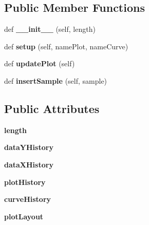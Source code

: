 \subsection*{Public Member Functions}
\begin{DoxyCompactItemize}
\item 
\mbox{\label{classmonitor_realtime_1_1_history_plot_a18d463af2d73ee5e5e0e0e0944addf4f}} 
def {\bfseries \+\_\+\+\_\+init\+\_\+\+\_\+} (self, length)
\item 
\mbox{\label{classmonitor_realtime_1_1_history_plot_ae5b223c971b02a7b84e04aebff13b42f}} 
def {\bfseries setup} (self, name\+Plot, name\+Curve)
\item 
\mbox{\label{classmonitor_realtime_1_1_history_plot_a5d96135f425edcfd6b6be8008a8bee2b}} 
def {\bfseries update\+Plot} (self)
\item 
\mbox{\label{classmonitor_realtime_1_1_history_plot_ae1e250320948b387f077231771e57d88}} 
def {\bfseries insert\+Sample} (self, sample)
\end{DoxyCompactItemize}
\subsection*{Public Attributes}
\begin{DoxyCompactItemize}
\item 
\mbox{\label{classmonitor_realtime_1_1_history_plot_a3049a51b9eeca5764576a20cb90fe34e}} 
{\bfseries length}
\item 
\mbox{\label{classmonitor_realtime_1_1_history_plot_a0479e0b926a6e0278f74d274914dbed4}} 
{\bfseries data\+Y\+History}
\item 
\mbox{\label{classmonitor_realtime_1_1_history_plot_a957e938bf378084e0c8c6c83b3290c4c}} 
{\bfseries data\+X\+History}
\item 
\mbox{\label{classmonitor_realtime_1_1_history_plot_a70a9ffc0b3fb85c4d6364627133f3947}} 
{\bfseries plot\+History}
\item 
\mbox{\label{classmonitor_realtime_1_1_history_plot_aaec7ae44f63f1f935e36a8f2b9796ac7}} 
{\bfseries curve\+History}
\item 
\mbox{\label{classmonitor_realtime_1_1_history_plot_a731ed9a916c1285c3539b4425ba732fe}} 
{\bfseries plot\+Layout}
\end{DoxyCompactItemize}


